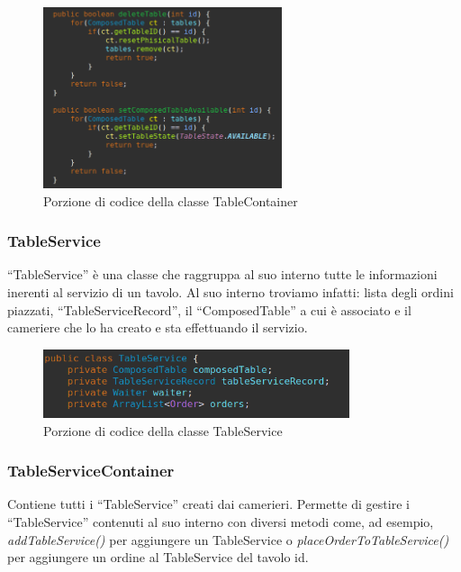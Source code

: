 \documentclass{article}
\begin{document}
\begin{figure}[!h]
\centering
\includegraphics[width= 7cm]{"Codice/TableContainer2.PNG"}
\caption{Porzione di codice della classe TableContainer}
\end{figure}

\newpage

\subsubsection{TableService}

``TableService'' \`e una classe che raggruppa al suo interno tutte le informazioni inerenti al servizio di un tavolo. Al suo interno troviamo infatti: lista degli ordini piazzati, ``TableServiceRecord'', il ``ComposedTable'' a cui \`e associato e il cameriere che lo ha creato e sta effettuando il servizio.


\begin{figure}[!h]
\centering
\includegraphics[width= 9cm]{"Codice/TableService.PNG"}
\caption{Porzione di codice della classe TableService}
\end{figure}

\subsubsection{TableServiceContainer}

Contiene tutti i ``TableService'' creati dai camerieri. Permette di gestire i ``TableService'' contenuti al suo interno con diversi metodi come, ad esempio, \textit{addTableService()} per aggiungere un TableService o \textit{placeOrderToTableService()} per aggiungere un ordine al TableService del tavolo id.
\end{document}
